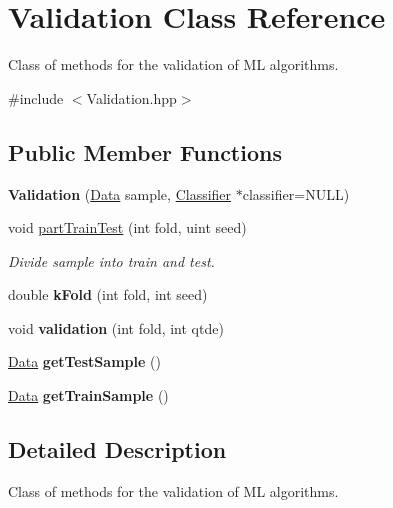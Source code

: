 \hypertarget{class_validation}{}\section{Validation Class Reference}
\label{class_validation}


Class of methods for the validation of ML algorithms.  




{\ttfamily \#include $<$Validation.\+hpp$>$}

\subsection*{Public Member Functions}
\begin{DoxyCompactItemize}
\item 
\mbox{\label{class_validation_a874c6394992adb0d577e85eb9f439981}} 
{\bfseries Validation} (\hyperlink{class_data}{Data} sample, \hyperlink{class_classifier}{Classifier} $\ast$classifier=N\+U\+LL)
\item 
void \hyperlink{class_validation_ad50f5974699c4d13098371fdf56f8342}{part\+Train\+Test} (int fold, uint seed)
\begin{DoxyCompactList}\small\item\em Divide sample into train and test. \end{DoxyCompactList}\item 
\mbox{\label{class_validation_a3aae72caef37b12a57aaf5cdd862de3a}} 
double {\bfseries k\+Fold} (int fold, int seed)
\item 
\mbox{\label{class_validation_a166305aa3f117b119da69d54778286a0}} 
void {\bfseries validation} (int fold, int qtde)
\item 
\mbox{\label{class_validation_a6ef1b8600535a064b9a94507afdf849c}} 
\hyperlink{class_data}{Data} {\bfseries get\+Test\+Sample} ()
\item 
\mbox{\label{class_validation_a656f4919ec48a7f26063d046d583433a}} 
\hyperlink{class_data}{Data} {\bfseries get\+Train\+Sample} ()
\end{DoxyCompactItemize}


\subsection{Detailed Description}
Class of methods for the validation of ML algorithms. 

